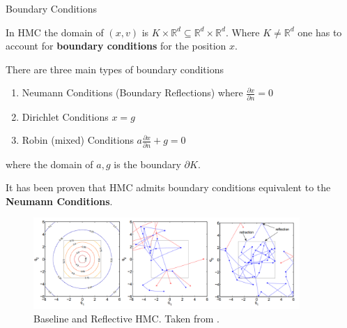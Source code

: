 \documentclass{beamer}
\begin{document}
\begin{frame}[allowframebreaks]{Boundary Conditions}

    In HMC the domain of $(x, v)$ is $K \times \mathbb R^d \subseteq \mathbb R^d \times \mathbb R^d$. Where $K \neq \mathbb R^d$ one has to account for \textbf{boundary conditions} for the position $x$. 
    
    
    \medskip
    
    There are three main types of boundary conditions
    
    \begin{enumerate}
        \item Neumann Conditions (Boundary Reflections) where $\frac {\partial x} {\partial n} = 0$
        \item Dirichlet Conditions $x = g$
        \item Robin (mixed) Conditions $a \frac {\partial x} {\partial n} + g = 0$
    \end{enumerate} 
    
    where the domain of $a, g$ is the boundary $\partial K$. 
    
    It has been proven \cite{pakman2014exact} that HMC admits boundary conditions equivalent to the \textbf{Neumann Conditions}.
    
    \framebreak
    
    \begin{figure}
        \centering
        \includegraphics[width=0.9\textwidth]{publications/presentations/log_concave_sampling/reflection.png}
        \caption{Baseline and Reflective HMC. Taken from \cite{afshar2015reflection}.} 
        \label{fig:reflection}
    \end{figure}

\end{frame}
\end{document}
